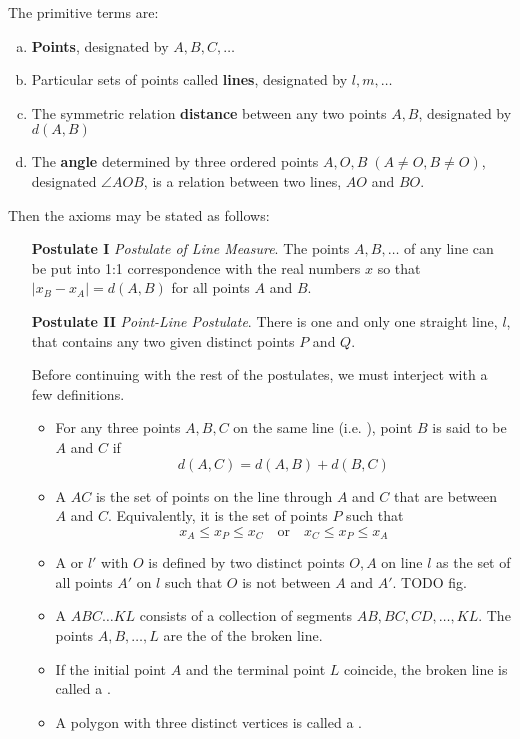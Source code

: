 The primitive terms are:
\begin{enumerate}[(a)]
\item \textbf{Points}, designated by $A,B,C, \ldots$
\item Particular sets of points called \textbf{lines}, designated by $l,m, \ldots$
\item The symmetric relation \textbf{distance} between any two points $A,B$, designated by $d(A,B)$
\item The \textbf{angle} determined by three ordered points $A,O,B \;(A\neq O, B\neq O)$, designated $\angle AOB$, is a relation between two lines, $AO$ and $BO$.
\end{enumerate}
Then the axioms may be stated as follows:
\begin{enumerate}
\item[\textbf{Postulate I}] \textit{Postulate of Line Measure}. The points $A, B, \ldots$ of any line can be put into 1:1 correspondence with the real numbers $x$ so that $|x_B - x_A| = d(A, B)$ for all points $A$ and $B$. 
\item[\textbf{Postulate II}] \textit{Point-Line Postulate}. There is one and only one straight line, $l$, that contains any two given distinct points $P$ and $Q$.

\begin{definition}
Before continuing with the rest of the postulates, we must interject with a few definitions.
\begin{itemize}
\item For any three points $A,B,C$ on the same line (i.e. ), point $B$ is said to be  $A$ and $C$ if
\[ d(A,C) = d(A,B) + d(B,C) \]
\item A  $AC$ is the set of points on the line through $A$ and $C$ that are between $A$ and $C$. Equivalently, it is the set of points $P$ such that
\[ x_A \leq x_P \leq x_C \quad \text{or} \quad x_C \leq x_P \leq x_A \]
\item A  or  $l'$ with  $O$ is defined by two distinct points $O,A$ on line $l$ as the set of all points $A'$ on $l$ such that $O$ is not between $A$ and $A'$. TODO fig.
\item A  $ABC\ldots KL$ consists of a collection of segments $AB, BC, CD, \ldots, KL$. The points $A,B, \ldots, L$ are the  of the broken line.
\item If the initial point $A$ and the terminal point $L$ coincide, the broken line is called a .
\item A polygon with three distinct vertices is called a .
\end{itemize}
\end{definition}


\end{enumerate}
